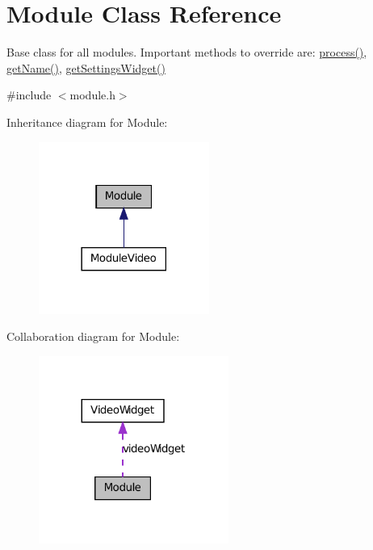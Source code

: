 \hypertarget{class_module}{
\section{Module Class Reference}
\label{dd/df9/class_module}
}


Base class for all modules. Important methods to override are: \hyperlink{class_module_a5105981c562627043d38527dc31124c8}{process()}, \hyperlink{class_module_a1cf07480fdd9a964eb8375bf2fb549b0}{getName()}, \hyperlink{class_module_a7a6a83882ef0d9aec623577884ce2fb5}{getSettingsWidget()}  




{\ttfamily \#include $<$module.h$>$}



Inheritance diagram for Module:\nopagebreak
\begin{figure}[H]
\begin{center}
\leavevmode
\includegraphics[width=158pt]{d1/d4b/class_module__inherit__graph}
\end{center}
\end{figure}


Collaboration diagram for Module:
\nopagebreak
\begin{figure}[H]
\begin{center}
\leavevmode
\includegraphics[width=176pt]{d0/d57/class_module__coll__graph}
\end{center}
\end{figure}
